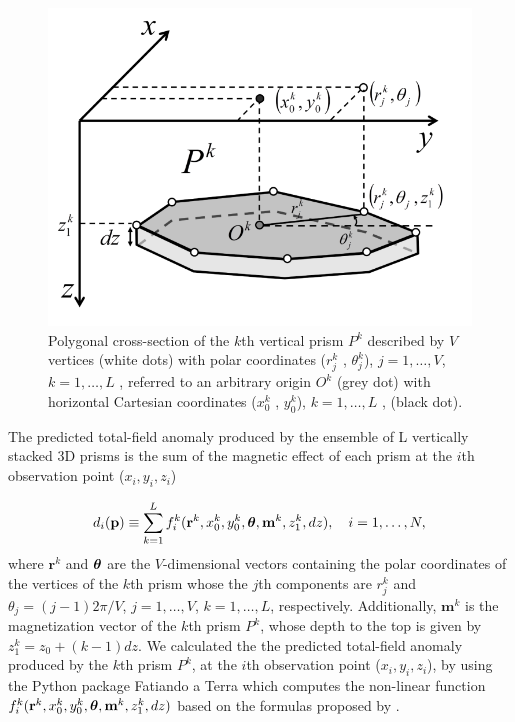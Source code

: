 \documentclass[extra,mreferee]{gji}
\begin{document}
\begin{figure}
    \centering
    \includegraphics[scale=0.3]{figures/prism_parameters_mod.png}
    \caption{Polygonal cross-section of the $k$th vertical prism $P^k$ described by $V$ vertices (white dots) with polar coordinates ($r^k_j$ , $\theta ^k_j$), $j = 1, \dots, V$, $k = 1, \dots, L$ , referred to an arbitrary origin $O^k$ (grey dot) with horizontal Cartesian coordinates ($x_0^k$ , $y_0^k$), $k = 1, \dots, L$ , (black dot).}
    \label{fig:prism_parameters}
\end{figure}

The predicted total-field anomaly produced by the ensemble of L vertically stacked 3D prisms is the sum of the magnetic effect of each prism at the $i$th observation point ($x_i, y_i, z_i$)

\begin{equation}\label{eq:predicted}
d_i (\mathbf{p}) \equiv \sum\limits_{k=1}^L f_i^k(\mathbf{r}^k, x_0^k, y_0^k,\mbox{\boldmath$\theta$}, \mathbf{m}^k, z^k_1, dz), \quad i=1,\dots,N,
\end{equation}
where $\mathbf{r}^k$ and $\mbox{\boldmath$\theta$}$ are the $V$-dimensional vectors containing the polar coordinates of the vertices of the $k$th prism whose the $j$th components are $r^k_j$ and $\theta_j = (j-1)2\pi/V$, $j=1,\dots , V$, $k=1,\dots ,L$, respectively. Additionally, $\mathbf{m}^k$ is the magnetization vector of the $k$th prism $P^k$, whose depth to the top is given by $z_1^k = z_0 + (k-1)dz$. We calculated the the predicted total-field anomaly produced by the $k$th prism $P^k$, at the $i$th observation point ($x_i, y_i, z_i$), by using the Python package Fatiando a Terra \citep{uieda-proc-scipy-2013} which computes the non-linear function $f_i^k(\mathbf{r}^k, x_0^k, y_0^k,\mbox{\boldmath$\theta$}, \mathbf{m}^k, z^k_1, dz)$ based on the formulas proposed by \cite{PlouffD.1976Gamf}.
\end{document}
